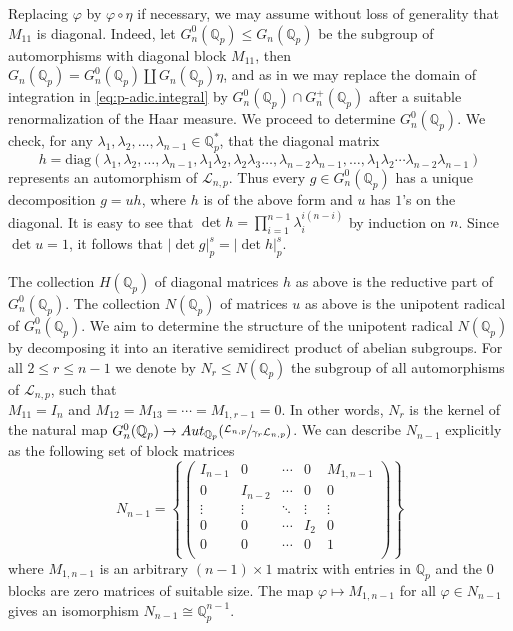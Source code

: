 \documentclass{article}
\begin{document}
Replacing $\varphi$ by $\varphi\circ\eta$ if necessary, we may assume without loss of generality that $M_{11}$ is diagonal. Indeed, let $G_{n}^{0}(\mathbb{Q}_{p})\leq{G_{n}(\mathbb{Q}_{p})}$ be the subgroup of automorphisms with diagonal block $M_{11}$, then\\ $G_{n}(\mathbb{Q}_{p})=G_{n}^{0}(\mathbb{Q}_{p})\coprod{G_{n}(\mathbb{Q}_{p})}\eta$, and as in \cite[Proposition 2.1]{DuSautoyLubotzky} we may replace the domain of integration in \eqref{eq:p-adic.integral} by $G_{n}^{0}(\mathbb{Q}_{p})\cap{G_{n}^{+}(\mathbb{Q}_{p})}$ after a suitable renormalization of the Haar measure. We proceed to determine $G_{n}^{0}(\mathbb{Q}_{p})$.
We check, for any $\lambda_{1},\lambda_{2},\dots,\lambda_{n-1}\in\mathbb{Q}_{p}^{\ast}$, that the diagonal matrix \[h=\mathrm{diag}(\lambda_{1},\lambda_{2},\dots,\lambda_{n-1},\lambda_{1}\lambda_{2},\lambda_{2}\lambda_{3}\dots,\lambda_{n-2}\lambda_{n-1},\dots,\lambda_{1}\lambda_{2}\cdots\lambda_{n-2}\lambda_{n-1})\]
represents an automorphism of $\mathcal{L}_{n,p}$. Thus every $g\in{G_{n}^{0}(\mathbb{Q}_{p})}$ has a unique decomposition $g=uh$, where $h$ is of the above form and $u$ has $1$'s on the diagonal. It is easy to see that $\det{h}=\prod_{i=1}^{n-1}\lambda_i^{i(n-i)}$ by induction on $n$. Since $\det{u}=1$, it follows that $|\det{g}|_{p}^{s}=|\det{h}|_{p}^{s}$.

The collection $H(\mathbb{Q}_{p})$ of diagonal matrices $h$ as above is the reductive part of $G_{n}^{0}(\mathbb{Q}_{p})$. The collection $N(\mathbb{Q}_{p})$ of matrices $u$ as above is the unipotent radical of $G_{n}^{0}(\mathbb{Q}_{p})$. We aim to determine the structure of the unipotent radical $N(\mathbb{Q}_p)$ by decomposing it into an iterative semidirect product of abelian subgroups.
For all $2\leq{r}\leq{n-1}$ we denote by $N_{r}\leq{N(\mathbb{Q}_{p})}$ the subgroup of all automorphisms of $\mathcal{L}_{n,p}$, such that\\ $M_{11}=I_{n}$ and $M_{12}=M_{13}=\cdots=M_{1,r-1}=0$. In other words, $N_{r}$ is the kernel of the natural map $G_{n}^{0}(\mathbb{Q}_{p})\rightarrow{Aut_{\mathbb{Q}_{p}}(\sfrac{\mathcal{L}_{n,p}}{\gamma_{r}\mathcal{L}_{n,p}})}$. We can describe $N_{n-1}$ explicitly as the following set of block matrices \[
N_{n-1}=\left\{\begin{pmatrix}
I_{n-1} & 0 & \cdots & 0 & M_{1,n-1}\\
0 & I_{n-2} & \cdots & 0 & 0\\
\vdots & \vdots & \ddots & \vdots & \vdots\\
0 & 0 & \cdots & I_{2} & 0\\
0 & 0 & \cdots & 0 & 1\\
\end{pmatrix}\right\}
\]
where $M_{1,n-1}$ is an arbitrary $(n-1)\times{1}$ matrix with entries in $\mathbb{Q}_{p}$ and the $0$ blocks are zero matrices of suitable size. The map $\varphi\mapsto{M_{1,n-1}}$ for all $\varphi\in{N_{n-1}}$ gives an isomorphism $N_{n-1}\cong\mathbb{Q}_{p}^{n-1}$.
\end{document}

